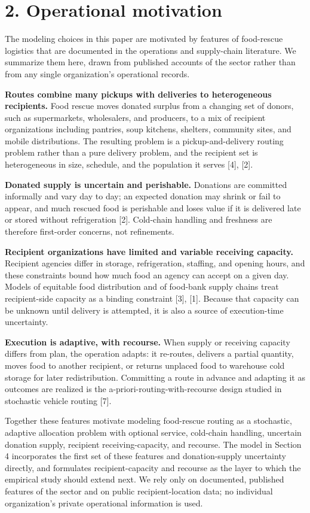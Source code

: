\documentclass[
  11pt,
]{article}
\begin{document}
\section{2. Operational motivation}\label{operational-motivation}

The modeling choices in this paper are motivated by features of
food-rescue logistics that are documented in the operations and
supply-chain literature. We summarize them here, drawn from published
accounts of the sector rather than from any single organization's
operational records.

\textbf{Routes combine many pickups with deliveries to heterogeneous
recipients.} Food rescue moves donated surplus from a changing set of
donors, such as supermarkets, wholesalers, and producers, to a mix of
recipient organizations including pantries, soup kitchens, shelters,
community sites, and mobile distributions. The resulting problem is a
pickup-and-delivery routing problem rather than a pure delivery problem,
and the recipient set is heterogeneous in size, schedule, and the
population it serves {[}4{]}, {[}2{]}.

\textbf{Donated supply is uncertain and perishable.} Donations are
committed informally and vary day to day; an expected donation may
shrink or fail to appear, and much rescued food is perishable and loses
value if it is delivered late or stored without refrigeration {[}2{]}.
Cold-chain handling and freshness are therefore first-order concerns,
not refinements.

\textbf{Recipient organizations have limited and variable receiving
capacity.} Recipient agencies differ in storage, refrigeration,
staffing, and opening hours, and these constraints bound how much food
an agency can accept on a given day. Models of equitable food
distribution and of food-bank supply chains treat recipient-side
capacity as a binding constraint {[}3{]}, {[}1{]}. Because that capacity
can be unknown until delivery is attempted, it is also a source of
execution-time uncertainty.

\textbf{Execution is adaptive, with recourse.} When supply or receiving
capacity differs from plan, the operation adapts: it re-routes, delivers
a partial quantity, moves food to another recipient, or returns unplaced
food to warehouse cold storage for later redistribution. Committing a
route in advance and adapting it as outcomes are realized is the
a-priori-routing-with-recourse design studied in stochastic vehicle
routing {[}7{]}.

Together these features motivate modeling food-rescue routing as a
stochastic, adaptive allocation problem with optional service,
cold-chain handling, uncertain donation supply, recipient
receiving-capacity, and recourse. The model in Section 4 incorporates
the first set of these features and donation-supply uncertainty
directly, and formulates recipient-capacity and recourse as the layer to
which the empirical study should extend next. We rely only on
documented, published features of the sector and on public
recipient-location data; no individual organization's private
operational information is used.
\end{document}

